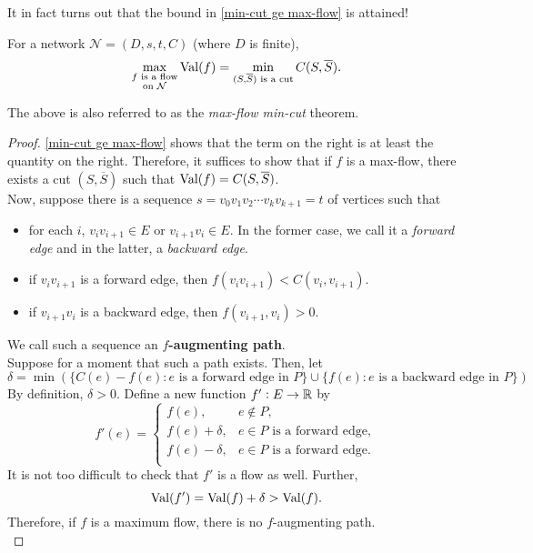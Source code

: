 			It in fact turns out that the bound in \eqref{min-cut ge max-flow} is attained!

			\begin{ftheo}
				For a network $\mathcal{N} = (D,s,t,C)$ (where $D$ is finite),
				\[ \max_{\substack{f\text{ is a flow} \\ \text{on }\mathcal{N}}} \operatorname{Val}(f) = \min_{(S,\overline{S}) \text{ is a cut}} C(S,\overline{S}). \]
			\end{ftheo}
			The above is also referred to as the \emph{max-flow min-cut} theorem.
			\begin{proof}
				\eqref{min-cut ge max-flow} shows that the term on the right is at least the quantity on the right. Therefore, it suffices to show that if $f$ is a max-flow, there exists a cut $(S,\overline{S})$ such that $\operatorname{Val}(f) = C(S,\overline{S})$.\\
				Now, suppose there is a sequence $s = v_0 v_1 v_2 \cdots v_k v_{k+1} = t$ of vertices such that
				\begin{itemize}
					\item for each $i$, $v_i v_{i+1} \in E$ or $v_{i+1} v_i \in E$. In the former case, we call it a \emph{forward edge} and in the latter, a \emph{backward edge}.
					\item if $v_i v_{i+1}$ is a forward edge, then $f(v_iv_{i+1}) < C(v_i, v_{i+1})$.
					\item if $v_{i+1} v_i$ is a backward edge, then $f(v_{i+1},v_i) > 0$.
				\end{itemize}
				We call such a sequence an \textbf{$f$-augmenting path}.\\
				Suppose for a moment that such a path exists. Then, let
				\[ \delta = \min \left(\{ C(e) - f(e) : e \text{ is a forward edge in $P$} \} \cup \{ f(e) : e \text{ is a backward edge in $P$} \}\right) \]
				By definition, $\delta > 0$. Define a new function $f' : E \to \mathbb{R}$ by
				\[
					f'(e) =
					\begin{cases}
						f(e), & e \not\in P, \\
						f(e) + \delta, & e \in P\text{ is a forward edge}, \\
						f(e) - \delta, & e \in P\text{ is a forward edge}. \\
					\end{cases}
				\]
				It is not too difficult to check that $f'$ is a flow as well. Further,
				\[ \operatorname{Val}(f') = \operatorname{Val}(f) + \delta > \operatorname{Val}(f). \]
				Therefore, if $f$ is a maximum flow, there is no $f$-augmenting path.\\

\end{proof}
